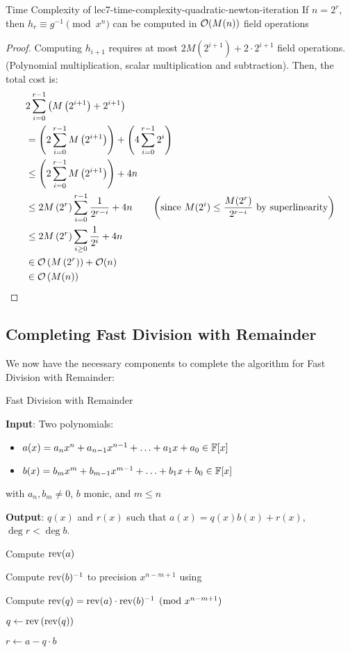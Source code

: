 \begin{theorem}{Time Complexity of }{lec7-time-complexity-quadratic-newton-iteration}
    If $n = 2^r$, then $h_r \equiv g^{-1} \pmod{x^n}$ can be computed in $\operatorname{\mathcal{O}}(M(n))$ field operations    
\end{theorem}
\begin{proof}
    Computing $h_{i + 1}$ requires at most $2M(2^{i + 1}) + 2 \cdot 2^{i + 1}$ field operations. (Polynomial multiplication, scalar multiplication and subtraction).
    Then, the total cost is:
    \begin{align*}
        &2\sum_{i = 0}^{r - 1} \left(M\left(2^{i + 1}\right) + 2^{i + 1}\right) \\
        &= \left(2\sum_{i = 0}^{r - 1} M\left(2^{i + 1}\right)\right) + \left(4\sum_{i = 0}^{r - 1}2^i\right) \\
        &\leq \left(2\sum_{i = 0}^{r - 1} M\left(2^{i + 1}\right)\right) + 4n \\
        &\leq 2M\left(2^r\right)\sum_{i = 0}^{r - 1} \frac{1}{2^{r - i}} + 4n \qquad \left(\text{since $M(2^i) \leq \frac{M(2^r)}{2^{r - i}}$ by superlinearity}\right) \\
        &\leq 2M\left(2^r\right)\sum_{i \geq 0} \frac{1}{2^i} + 4n \\
        &\in \operatorname{\mathcal{O}}\left(M\left(2^r\right)\right) + \operatorname{\mathcal{O}}(n) \\
        &\in \operatorname{\mathcal{O}}\left(M(n)\right)
    \end{align*}
\end{proof}

\subsection{Completing Fast Division with Remainder}
We now have the necessary components to complete the algorithm for Fast Division with Remainder:

\begin{algorithm}[H]
    \caption{Fast Division with Remainder}\label{alg:fast-division-with-remainder}
    
    \textbf{Input}: Two polynomials: 
    \begin{itemize}
        \item $a(x) = a_nx^n + a_{n-1}x^{n-1} + \ldots + a_1x + a_0 \in \operatorname{\mathbb{F}}[x]$
        \item $b(x) = b_mx^m + b_{m-1}x^{m-1} + \ldots + b_1x + b_0 \in \operatorname{\mathbb{F}}[x]$
    \end{itemize} 
    with $a_n, b_m \neq 0$, $b$ monic, and $m \leq n$
    
    \textbf{Output}: $q(x)$ and $r(x)$ such that $a(x) = q(x)b(x) + r(x)$, $\deg r < \deg b$.

    \BlankLine
    \nl Compute $\operatorname{rev}(a)$

    \nl Compute $\operatorname{rev}(b)^{-1}$ to precision $x^{n - m + 1}$ using 

    \nl Compute $\operatorname{rev}(q) = \operatorname{rev}(a)\cdot\operatorname{rev}(b)^{-1} \pmod{x^{n - m + 1}}$

    \nl $q \leftarrow \operatorname{rev}\left(\operatorname{rev}(q)\right)$

    \nl $r \leftarrow a - q \cdot b$
\end{algorithm}

